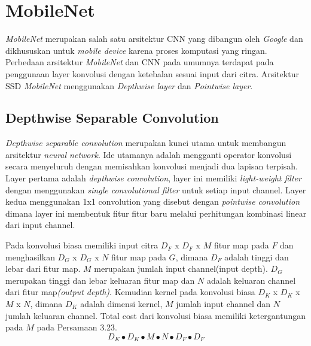 \section{MobileNet}
\emph{MobileNet} merupakan salah satu arsitektur CNN yang dibangun oleh \emph{Google} dan dikhususkan untuk \emph{mobile device} karena proses komputasi yang ringan. Perbedaan arsitektur \emph{MobileNet} dan CNN pada umumnya terdapat pada penggunaan layer konvolusi dengan ketebalan sesuai input dari citra. Arsitektur SSD \emph{MobileNet} menggunakan \emph{Depthwise layer} dan \emph{Pointwise layer}.
\subsection{Depthwise Separable Convolution}
\emph{Depthwise separable convolution} merupakan kunci utama untuk membangun arsitektur \emph{neural network}. Ide utamanya adalah mengganti operator konvolusi secara menyeluruh dengan memisahkan konvolusi menjadi dua lapisan terpisah. Layer pertama adalah \emph{depthwise convolution}, layer ini memiliki \emph{light-weight filter} dengan menggunakan \emph{single convolutional filter} untuk setiap input channel. Layer kedua menggunakan 1x1 convolution yang disebut dengan \emph{pointwise convolution} dimana layer ini membentuk fitur fitur baru melalui perhitungan kombinasi linear dari input channel. 

Pada konvolusi biasa memiliki input citra $D_F$ x $D_F$ x $M $ fitur map pada $F$ dan menghasilkan $ D_G$ x $D_G$ x $N $ fitur map pada $G$, dimana $D_F$ adalah tinggi dan lebar dari fitur map. $M$ merupakan jumlah input channel(input depth). 
$D_G$ merupakan tinggi dan lebar keluaran fitur map dan $N$ adalah keluaran channel dari fitur map\emph{(output depth)}. Kemudian kernel pada konvolusi biasa $D_K$ x $D_K$ x $M$ x $N$, dimana $D_K$ adalah dimensi kernel, $M$ jumlah input channel dan $N$ jumlah keluaran channel. Total cost dari konvolusi biasa memiliki ketergantungan pada $M$ pada Persamaan 3.23.
\begin{equation}
	D_K \bullet D_K \bullet M \bullet N \bullet D_F \bullet D_F
\end{equation}

